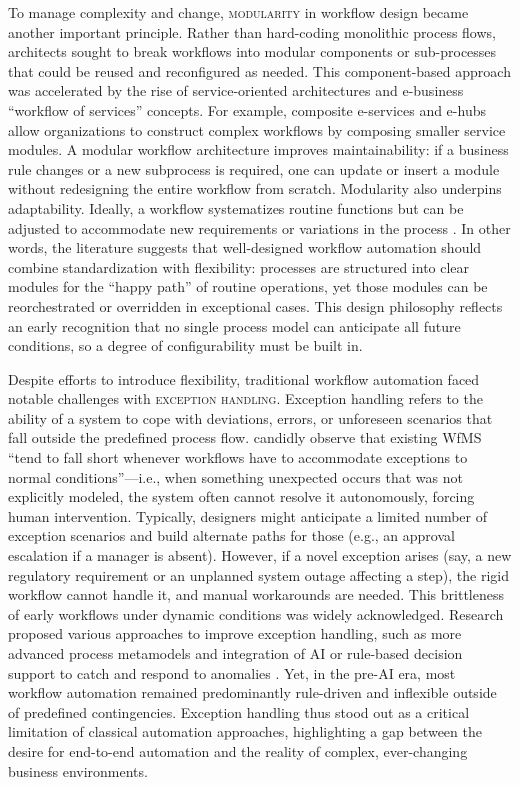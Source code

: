 To manage complexity and change, \textsc{modularity} in workflow design became another important principle. Rather than hard-coding monolithic process flows, architects sought to break workflows into modular components or sub-processes that could be reused and reconfigured as needed. This component-based approach was accelerated by the rise of service-oriented architectures and e-business “workflow of services” concepts. For example, composite e-services and e-hubs allow organizations to construct complex workflows by composing smaller service modules. A modular workflow architecture improves maintainability: if a business rule changes or a new subprocess is required, one can update or insert a module without redesigning the entire workflow from scratch. Modularity also underpins adaptability. Ideally, a workflow systematizes routine functions but can be adjusted to accommodate new requirements or variations in the process \parencite{basuResearch2002}. In other words, the literature suggests that well-designed workflow automation should combine standardization with flexibility: processes are structured into clear modules for the “happy path” of routine operations, yet those modules can be reorchestrated or overridden in exceptional cases. This design philosophy reflects an early recognition that no single process model can anticipate all future conditions, so a degree of configurability must be built in.

Despite efforts to introduce flexibility, traditional workflow automation faced notable challenges with \textsc{exception handling}. Exception handling refers to the ability of a system to cope with deviations, errors, or unforeseen scenarios that fall outside the predefined process flow. \textcite{basuResearch2002} candidly observe that existing WfMS “tend to fall short whenever workflows have to accommodate exceptions to normal conditions”—i.e., when something unexpected occurs that was not explicitly modeled, the system often cannot resolve it autonomously, forcing human intervention. Typically, designers might anticipate a limited number of exception scenarios and build alternate paths for those (e.g., an approval escalation if a manager is absent). However, if a novel exception arises (say, a new regulatory requirement or an unplanned system outage affecting a step), the rigid workflow cannot handle it, and manual workarounds are needed. This brittleness of early workflows under dynamic conditions was widely acknowledged. Research proposed various approaches to improve exception handling, such as more advanced process metamodels and integration of AI or rule-based decision support to catch and respond to anomalies \parencite{basuResearch2002}. Yet, in the pre-AI era, most workflow automation remained predominantly rule-driven and inflexible outside of predefined contingencies. Exception handling thus stood out as a critical limitation of classical automation approaches, highlighting a gap between the desire for end-to-end automation and the reality of complex, ever-changing business environments.


